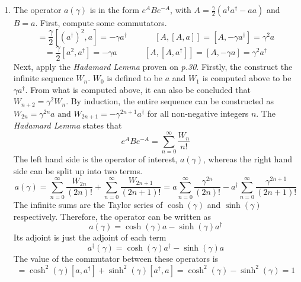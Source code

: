 \begin{sol}
\begin{enumerate}[label=\textbf{(\alph*)}]
\item
The operator $a(\gamma)$ is in the form $e^ABe^{-A}$, with $A=\frac{\gamma}{2}(a^\dagger a^\dagger-aa)$ and $B=a$. First, compute some commutators.
\begin{equation}
	[A,a]=\frac{\gamma}{2}[(a^\dagger)^2,a]=-\gamma a^\dagger\:\:\:\:\:\:\:\:\:\:\:\:\:\:\:[A,[A,a]]=[A,-\gamma a^\dagger]=\gamma^2a
\end{equation} 
\begin{equation}
	[A, a^\dagger]=\frac{\gamma}{2}[a^2, a^\dagger]=-\gamma a\:\:\:\:\:\:\:\:\:\:\:\:\:\:\:[A,[A,a^\dagger]]=[A,-\gamma a]=\gamma^2a^\dagger
\end{equation} 
Next, apply the \textit{Hadamard Lemma} proven on \textit{p.30}. Firstly, the construct the infinite sequence $W_n$. $W_0$ is defined to be $a$ and $W_1$ is computed above to be $\gamma a^\dagger$. From what is computed above, it can also be concluded that $W_{n+2}=\gamma^2W_n$. By induction, the entire sequence can be constructed as $W_{2n}=\gamma^{2n}a\text{  and  }W_{2n+1}=-\gamma^{2n+1}a^\dagger$ for all non-negative integers $n$. The \textit{Hadamard Lemma} states that 
\begin{equation}
	e^ABe^{-A}=\sum_{n=0}^\infty\frac{W_n}{n!}
\end{equation} 
The left hand side is the operator of interest, $a(\gamma)$, whereas the right hand side can be split up into two terms.
\begin{equation}
	a(\gamma)=\sum_{n=0}^\infty\frac{W_{2n}}{(2n)!}+\sum_{n=0}^\infty\frac{W_{2n+1}}{(2n+1)!}=a\sum_{n=0}^\infty\frac{\gamma^{2n}}{(2n)!}-a^\dagger\sum_{n=0}^\infty\frac{\gamma^{2n+1}}{(2n+1)!}
\end{equation} 
The infinite sums are the Taylor series of $\cosh(\gamma)$ and $\sinh(\gamma)$ respectively. Therefore, the operator can be written as
\begin{equation}
	a(\gamma)=\cosh(\gamma)a-\sinh(\gamma)a^\dagger
\end{equation} 
Its adjoint is just the adjoint of each term
\begin{equation}
	a^\dagger(\gamma)=\cosh(\gamma)a^\dagger-\sinh(\gamma)a
\end{equation}
The value of the commutator between these operators is
\begin{equation}
	[a(\gamma),a^\dagger(\gamma)]=\cosh^2(\gamma)[a,a^\dagger]+\sinh^2(\gamma)[a^\dagger,a]=\cosh^2(\gamma)-\sinh^2(\gamma)=1

\end{equation}
\end{enumerate}
\end{sol}

